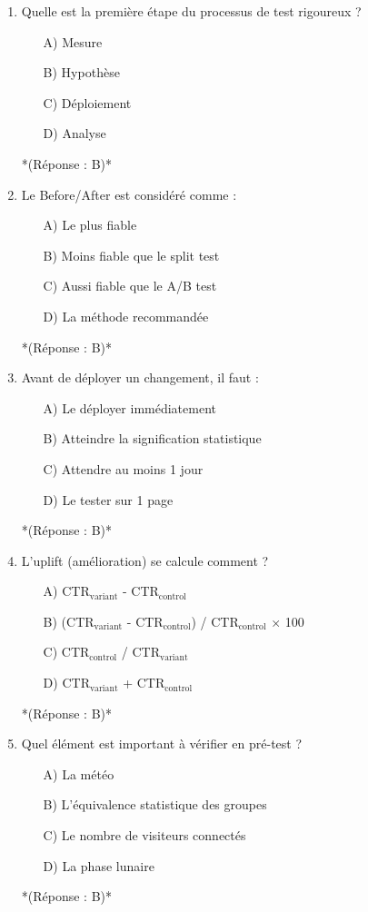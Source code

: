 \documentclass[12pt,a4paper,twoside]{report}
\begin{document}
\begin{enumerate}
    \item Quelle est la première étape du processus de test rigoureux ?
    \begin{itemize}
        \item[A)] Mesure
        \item[B)] Hypothèse
        \item[C)] Déploiement
        \item[D)] Analyse
    \end{itemize}
    *(Réponse : B)*

    \item Le Before/After est considéré comme :
    \begin{itemize}
        \item[A)] Le plus fiable
        \item[B)] Moins fiable que le split test
        \item[C)] Aussi fiable que le A/B test
        \item[D)] La méthode recommandée
    \end{itemize}
    *(Réponse : B)*

    \item Avant de déployer un changement, il faut :
    \begin{itemize}
        \item[A)] Le déployer immédiatement
        \item[B)] Atteindre la signification statistique
        \item[C)] Attendre au moins 1 jour
        \item[D)] Le tester sur 1 page
    \end{itemize}
    *(Réponse : B)*

    \item L'uplift (amélioration) se calcule comment ?
    \begin{itemize}
\item[A)] CTR$_{\text{variant}}$ - CTR$_{\text{control}}$
\item[B)] (CTR$_{\text{variant}}$ - CTR$_{\text{control}}$) / CTR$_{\text{control}}$ × 100
\item[C)] CTR$_{\text{control}}$ / CTR$_{\text{variant}}$
\item[D)] CTR$_{\text{variant}}$ + CTR$_{\text{control}}$
    \end{itemize}
    *(Réponse : B)*

    \item Quel élément est important à vérifier en pré-test ?
    \begin{itemize}
        \item[A)] La météo
        \item[B)] L'équivalence statistique des groupes
        \item[C)] Le nombre de visiteurs connectés
        \item[D)] La phase lunaire
    \end{itemize}
    *(Réponse : B)*


\end{enumerate}
\end{document}
